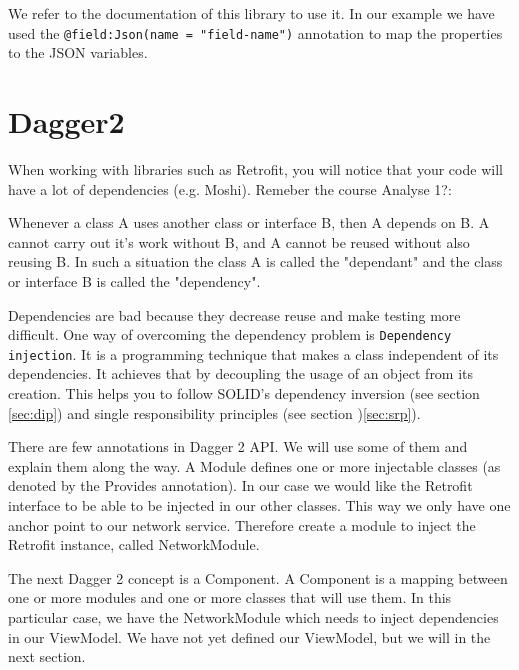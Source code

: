We refer to the documentation of this library to use it. In our example we have used the \lstinline!@field:Json(name = "field-name")! annotation to map the properties to the JSON variables. 


\section{Dagger2}
When working with libraries such as Retrofit, you will notice that your code will have a lot of dependencies (e.g. Moshi). Remeber the course Analyse 1?: 

\begin{framed}
	Whenever a class A uses another class or interface B, then A depends on B. A cannot carry out it's work without B, and A cannot be reused without also reusing B. In such a situation the class A is called the "dependant" and the class or interface B is called the "dependency".
\end{framed}
Dependencies are bad because they decrease reuse and make testing more difficult. One way of overcoming the dependency problem is \texttt{Dependency injection}. It is a programming technique that makes a class independent of its dependencies. It achieves that by decoupling the usage of an object from its creation. This helps you to follow SOLID's dependency inversion (see section \ref{sec:dip}) and single responsibility principles (see section )\ref{sec:srp}).

There are few annotations in Dagger 2 API. We will use some of them and explain them along the way. 
A Module defines one or more injectable classes (as denoted by the Provides annotation). In our case we would like the Retrofit interface to be able to be injected in our other classes. This way we only have one anchor point to our network service.  Therefore  create a module to inject the Retrofit instance, called NetworkModule.




The next Dagger 2 concept is a Component. A Component is a mapping between one or more modules and one or more classes that will use them. In this particular case, we have the NetworkModule which needs to inject dependencies in our ViewModel. We have not yet defined our ViewModel, but we will in the next section. 

